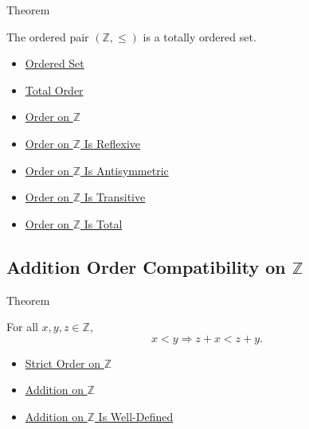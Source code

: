 \begin{theorembox}{Theorem}
\begin{theorem}
\label{thm:z-totally-ordered-set}
The ordered pair $(\mathbb{Z},\le)$ is a totally ordered set.
\end{theorem}
\end{theorembox}

\begin{dependencies}
\begin{itemize}
  \item \hyperref[def:ordered-set]{Ordered Set}
  \item \hyperref[def:total-order]{Total Order}
  \item \hyperref[def:order-on-z]{Order on $\mathbb{Z}$}
  \item \hyperref[thm:order-on-z-reflexive]{Order on $\mathbb{Z}$ Is Reflexive}
  \item \hyperref[thm:order-on-z-antisymmetric]{Order on $\mathbb{Z}$ Is Antisymmetric}
  \item \hyperref[thm:order-on-z-transitive]{Order on $\mathbb{Z}$ Is Transitive}
  \item \hyperref[thm:order-on-z-total]{Order on $\mathbb{Z}$ Is Total}
\end{itemize}
\end{dependencies}

\subsection*{\texorpdfstring{Addition Order Compatibility on $\mathbb{Z}$}{Addition Order Compatibility on Z}}

\begin{theorembox}{Theorem}
\begin{theorem}
\label{thm:left-addition-preserves-strict-order-on-z}
For all $x,y,z\in\mathbb{Z}$,
\[
x<y \Longrightarrow z+x<z+y.
\]
\end{theorem}
\end{theorembox}

\begin{dependencies}
\begin{itemize}
  \item \hyperref[def:strict-order-on-z]{Strict Order on $\mathbb{Z}$}
  \item \hyperref[def:addition-on-z-classes]{Addition on $\mathbb{Z}$}
  \item \hyperref[thm:addition-on-z-well-defined]{Addition on $\mathbb{Z}$ Is Well-Defined}
\end{itemize}
\end{dependencies}

